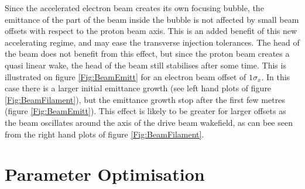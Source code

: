 \documentclass[aps,prstab,reprint,amsmath,amssymb,groupedaddress]{revtex4-1}
\begin{document}


Since the accelerated electron beam creates its own focusing bubble, the emittance of the part of the beam inside the
bubble is not affected by small beam offsets with respect to the proton beam axis. This is an added benefit of this new
accelerating regime, and may ease the transverse injection tolerances. The head of the beam does not benefit from this
effect, but since the proton beam creates a quasi linear wake, the head of the beam still stabilises after some time.
This is illustrated on figure \ref{Fig:BeamEmitt} for an electron beam offset of $1\sigma_{x}$. In this case there is a
larger initial emittance growth (see left hand plots of figure \ref{Fig:BeamFilament}), but the emittance growth stop
after the first few metres (figure \ref{Fig:BeamEmitt}). This effect is likely to be greater for larger offsets as the
beam oscillates around the axis of the drive beam wakefield, as can bee seen from the right hand plots of figure
\ref{Fig:BeamFilament}.

\section[\label{S:PO}]{Parameter Optimisation}
\end{document}
